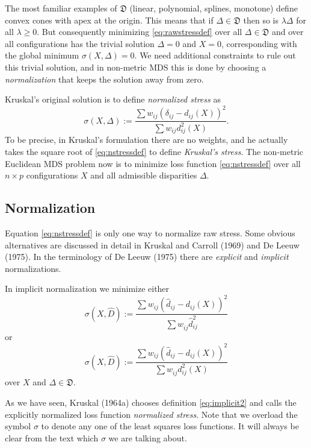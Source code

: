 \documentclass[
  12pt,
]{article}
\begin{document}
The most familiar examples of \(\mathfrak{D}\) (linear,
polynomial, splines, monotone) define convex cones with apex at the origin. This
means that if \(\Delta\in\mathfrak{D}\) then so is \(\lambda\Delta\) for all
\(\lambda\geq 0\). But consequently minimizing \eqref{eq:rawstressdef} over
all \(\Delta\in\mathfrak{D}\) and over all configurations has the trivial
solution \(\Delta=0\) and \(X=0\), corresponding with the global minimum
\(\sigma(X,\Delta)=0\). We need additional constraints to rule out this
trivial solution, and in non-metric MDS this is done by choosing a
\emph{normalization} that keeps the solution away from zero.

Kruskal's original solution is to define \emph{normalized stress} as
\begin{equation}
\sigma(X,\Delta):=\frac{\sum w_{ij}(\delta_{ij}-d_{ij}(X))^2}{\sum w_{ij}d_{ij}^2(X)}.
\label{eq:nstressdef}
\end{equation}
To be precise, in Kruskal's formulation there are no weights,
and he actually takes the square root of \eqref{eq:nstressdef} to define
\emph{Kruskal's stress}. The non-metric Euclidean MDS problem now is to minimize
loss function \eqref{eq:nstressdef} over all \(n\times p\) configurations
\(X\) and all admissible disparities \(\Delta\).

\subsection{Normalization}\label{normalization}

Equation \eqref{eq:nstressdef} is only one way to normalize raw stress. Some obvious alternatives are discussed in detail in
Kruskal and Carroll (1969) and De Leeuw (1975). In the terminology of
De Leeuw (1975) there are \emph{explicit} and \emph{implicit} normalizations.

In implicit normalization we minimize either
\begin{equation}
\sigma(X,\hat D):=\frac{\sum  w_{ij}(\hat d_{ij} -d_{ij}(X))^2}{\sum   w_{ij}^{\ }\hat d_{ij}^2}
\label{eq:implicit1}
\end{equation}
or
\begin{equation}
\sigma(X,\hat D):=\frac{\sum   w_{ij}(\hat d_{ij}-d_{ij}(X))^2}{\sum   w_{ij}^{\ }d_{ij}^2(X) }
\label{eq:implicit2}
\end{equation}
over \(X\) and \(\Delta\in\mathfrak{D}\).

As we have seen, Kruskal (1964a) chooses definition \eqref{eq:implicit2} and
calls the explicitly normalized loss function \emph{normalized stress}. Note that we overload the symbol \(\sigma\) to denote any one of the least squares loss
functions. It will always be clear from the text which \(\sigma\) we are
talking about.
\end{document}
